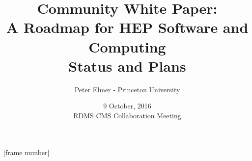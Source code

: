 \documentclass{beamer}
\title{Community White Paper: \\
       A Roadmap for HEP Software and Computing \\
       Status and Plans}
\author{Peter Elmer - Princeton University}
\date{9 October, 2016 \\ RDMS CMS Collaboration Meeting}
\begin{document}
\maketitle

%
%

[frame number]














%














%
%



%

%



\end{document}
